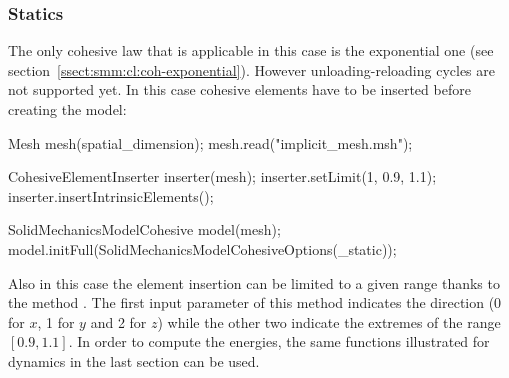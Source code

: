 \subsubsection{Statics}
The only cohesive law that is applicable in this case is the
exponential one (see
section~\ref{ssect:smm:cl:coh-exponential}). However
unloading-reloading cycles are not supported yet. In this case
cohesive elements have to be inserted before creating the
 model:
\begin{cpp}
  Mesh mesh(spatial_dimension);
  mesh.read("implicit_mesh.msh");

  CohesiveElementInserter inserter(mesh);
  inserter.setLimit(1, 0.9, 1.1);
  inserter.insertIntrinsicElements();

  SolidMechanicsModelCohesive model(mesh);
  model.initFull(SolidMechanicsModelCohesiveOptions(_static));
\end{cpp}
Also in this case the element insertion can be limited to a given
range thanks to the method . The first input parameter
of this method indicates the direction (0 for $x$, 1 for $y$ and 2 for
$z$) while the other two indicate the extremes of the range $[0.9,
1.1]$. In order to compute the energies, the same functions
illustrated for dynamics in the last section can be used.
